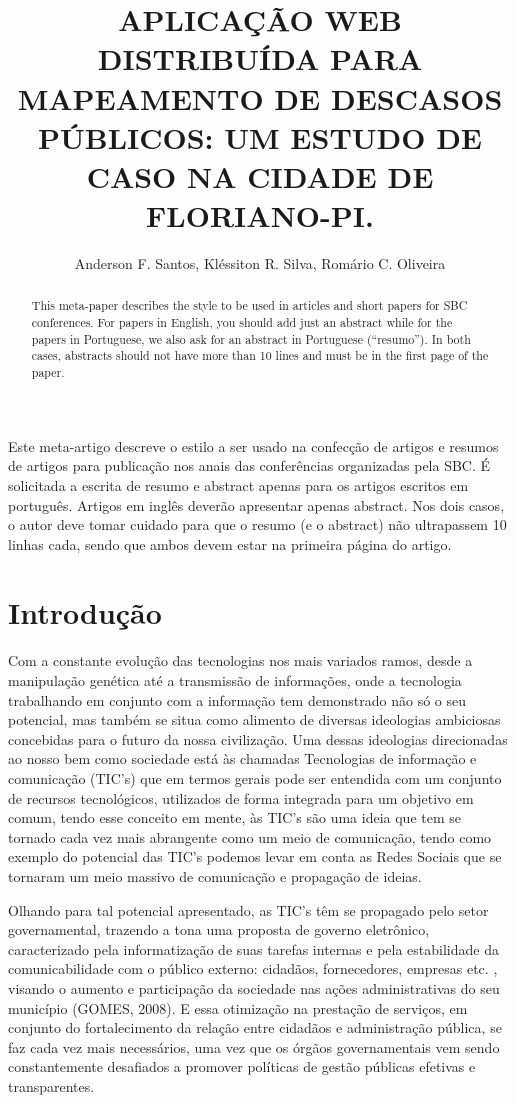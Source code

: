 \documentclass[12pt]{article}
\title{APLICAÇÃO WEB DISTRIBUÍDA PARA MAPEAMENTO DE DESCASOS PÚBLICOS: UM ESTUDO DE CASO NA CIDADE DE FLORIANO-PI.}
\author{Anderson F. Santos, Kléssiton R. Silva, Romário C. Oliveira}
\begin{document}
 

\maketitle

\begin{abstract}
  This meta-paper describes the style to be used in articles and short papers
  for SBC conferences. For papers in English, you should add just an abstract
  while for the papers in Portuguese, we also ask for an abstract in
  Portuguese (``resumo''). In both cases, abstracts should not have more than
  10 lines and must be in the first page of the paper.
\end{abstract}
     
\begin{resumo} 
  Este meta-artigo descreve o estilo a ser usado na confecção de artigos e
  resumos de artigos para publicação nos anais das conferências organizadas
  pela SBC. É solicitada a escrita de resumo e abstract apenas para os artigos
  escritos em português. Artigos em inglês deverão apresentar apenas abstract.
  Nos dois casos, o autor deve tomar cuidado para que o resumo (e o abstract)
  não ultrapassem 10 linhas cada, sendo que ambos devem estar na primeira
  página do artigo.
\end{resumo}

\section{Introdução}
Com a constante evolução das tecnologias nos mais variados ramos, desde a manipulação genética até a transmissão de informações, onde a tecnologia trabalhando em conjunto com a informação tem  demonstrado não só o seu potencial, mas também se situa como alimento de diversas ideologias ambiciosas concebidas para o futuro da nossa civilização. Uma dessas ideologias direcionadas ao nosso bem como sociedade está às chamadas Tecnologias de informação e comunicação (TIC’s) que em termos gerais pode ser entendida com um conjunto de recursos tecnológicos, utilizados de forma integrada para um objetivo em comum, tendo esse conceito em mente, às TIC’s são uma ideia que tem se tornado cada vez mais abrangente como um meio de comunicação, tendo como exemplo do potencial das TIC’s podemos levar em conta as Redes Sociais que se tornaram um meio massivo de comunicação e propagação de ideias.

Olhando para tal potencial apresentado, as TIC’s têm se propagado pelo setor governamental, trazendo a tona uma proposta de governo eletrônico, caracterizado pela informatização de suas tarefas internas e pela estabilidade da comunicabilidade com o público externo: cidadãos, fornecedores, empresas etc. , visando o aumento e participação da sociedade nas ações administrativas do seu município (GOMES, 2008). E essa otimização na prestação de serviços, em conjunto do fortalecimento da relação entre cidadãos e administração pública, se faz cada vez mais necessários, uma vez que os órgãos governamentais vem sendo constantemente desafiados a promover políticas de gestão públicas efetivas e transparentes.
\end{document}
